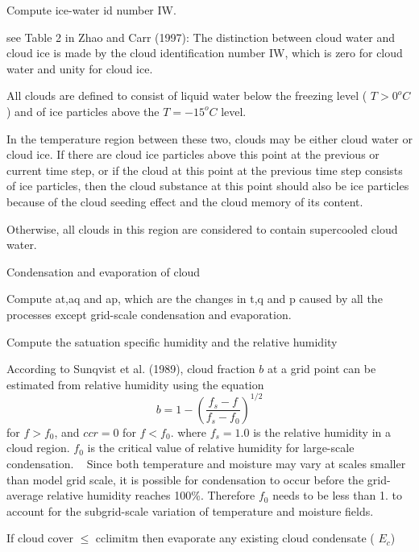 \begin{DoxyEnumerate}
\item Compute ice-\/water id number IW.
\begin{DoxyItemize}
\item see Table 2 in Zhao and Carr (1997)\+: The distinction between cloud water and cloud ice is made by the cloud identification number IW, which is zero for cloud water and unity for cloud ice.
\item All clouds are defined to consist of liquid water below the freezing level ( $T>0^oC$) and of ice particles above the $T=-15^oC$ level.
\item In the temperature region between these two, clouds may be either cloud water or cloud ice. If there are cloud ice particles above this point at the previous or current time step, or if the cloud at this point at the previous time step consists of ice particles, then the cloud substance at this point should also be ice particles because of the cloud seeding effect and the cloud memory of its content.
\item Otherwise, all clouds in this region are considered to contain supercooled cloud water.
\end{DoxyItemize}
\item Condensation and evaporation of cloud
\begin{DoxyItemize}
\item Compute at,aq and ap, which are the changes in t,q and p caused by all the processes except grid-\/scale condensation and evaporation.
\item Compute the satuation specific humidity and the relative humidity
\item According to Sunqvist et al. (1989), cloud fraction $b$ at a grid point can be estimated from relative humidity using the equation \[ b=1-\left ( \frac{f_{s}-f}{f_{s}-f_{0}} \right )^{1/2} \] for $f>f_{0}$, and $ccr=0$ for $f<f_{0}$. where $f_{s}=1.0$ is the relative humidity in a cloud region. $f_{0}$ is the critical value of relative humidity for large-\/scale condensation. ~\newline
 Since both temperature and moisture may vary at scales smaller than model grid scale, it is possible for condensation to occur before the grid-\/average relative humidity reaches 100\%. Therefore $f_{0}$ needs to be less than 1. to account for the subgrid-\/scale variation of temperature and moisture fields.
\item If cloud cover $\leq $ cclimitm then evaporate any existing cloud condensate ( $E_{c}$) ~\newline

\end{DoxyItemize}
\end{DoxyEnumerate}
